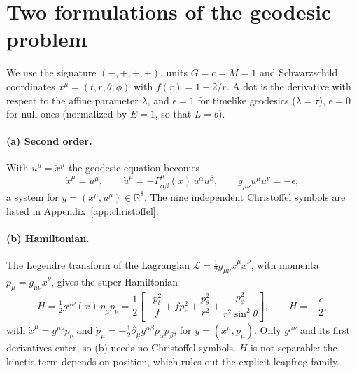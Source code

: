 \section{Two formulations of the geodesic problem}
\label{sec:formulations}

We use the signature $(-,+,+,+)$, units $G = c = M = 1$ and Schwarzschild coordinates
$x^\mu = (t, r, \theta, \phi)$ with $f(r) = 1 - 2/r$. A dot is the derivative with respect to
the affine parameter $\lambda$, and $\epsilon = 1$ for timelike geodesics ($\lambda = \tau$),
$\epsilon = 0$ for null ones (normalized by $E = 1$, so that $L = b$).

\paragraph{(a) Second order.} With $u^\mu = \dot x^\mu$ the geodesic equation becomes
\begin{equation}
  \dot x^\mu = u^\mu, \qquad \dot u^\mu = -\Gamma^\mu_{\alpha\beta}(x)\,u^\alpha u^\beta,
  \qquad g_{\mu\nu}u^\mu u^\nu = -\epsilon ,
  \label{eq:second-order}
\end{equation}
a system for $y = (x^\mu, u^\mu) \in \mathbb{R}^8$. The nine independent Christoffel symbols
are listed in Appendix~\ref{app:christoffel}.

\paragraph{(b) Hamiltonian.} The Legendre transform of the Lagrangian
$\mathcal{L} = \tfrac12 g_{\mu\nu}\dot x^\mu \dot x^\nu$, with momenta
$p_\mu = g_{\mu\nu}\dot x^\nu$, gives the super-Hamiltonian~\cite{mtw1973}
\begin{equation}
  H = \tfrac12 g^{\mu\nu}(x)\,p_\mu p_\nu
    = \frac12\left[-\frac{p_t^2}{f} + f p_r^2 + \frac{p_\theta^2}{r^2}
      + \frac{p_\phi^2}{r^2\sin^2\theta}\right],
  \qquad H = -\frac{\epsilon}{2},
  \label{eq:hamiltonian}
\end{equation}
with $\dot x^\mu = g^{\mu\nu}p_\nu$ and $\dot p_\mu = -\tfrac12\partial_\mu
g^{\alpha\beta}p_\alpha p_\beta$, for $y = (x^\mu, p_\mu)$. Only $g^{\mu\nu}$ and its first
derivatives enter, so (b) needs no Christoffel symbols. $H$ is not separable: the kinetic term
depends on position, which rules out the explicit leapfrog family.

